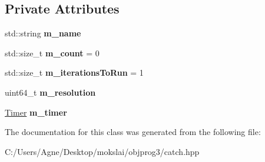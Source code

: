 \subsection*{Private Attributes}
\begin{DoxyCompactItemize}
\item 
\mbox{\label{class_catch_1_1_benchmark_looper_afa2005187a2abbcae69a5b16c89e68c3}} 
std\+::string {\bfseries m\+\_\+name}
\item 
\mbox{\label{class_catch_1_1_benchmark_looper_aae36ced9e5b1c884e2b3ac9d04c1c373}} 
std\+::size\+\_\+t {\bfseries m\+\_\+count} = 0
\item 
\mbox{\label{class_catch_1_1_benchmark_looper_af28bef6706fe983afca85d2ccd2b6ca8}} 
std\+::size\+\_\+t {\bfseries m\+\_\+iterations\+To\+Run} = 1
\item 
\mbox{\label{class_catch_1_1_benchmark_looper_a7e7168e3d346e78d6e85c810aec6a55d}} 
uint64\+\_\+t {\bfseries m\+\_\+resolution}
\item 
\mbox{\label{class_catch_1_1_benchmark_looper_af86aacecba12576f96a1d3f321a0c959}} 
\mbox{\hyperlink{class_catch_1_1_timer}{Timer}} {\bfseries m\+\_\+timer}
\end{DoxyCompactItemize}


The documentation for this class was generated from the following file\+:\begin{DoxyCompactItemize}
\item 
C\+:/\+Users/\+Agne/\+Desktop/mokslai/objprog3/catch.\+hpp\end{DoxyCompactItemize}
